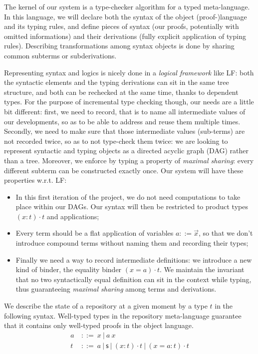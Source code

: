 \documentclass{article}
\newcommand{\sort}{\textsf{s}}
\newcommand{\gor}{\ |\ }
\newcommand{\gdecl}[2]{{#1}\ &::=\ {#2}}
\begin{document}
The kernel of our system is a type-checker algorithm for a typed
meta-language. In this language, we will declare both the syntax of
the object (proof-)language and its typing rules, and define pieces of
syntax (our proofs, potentially with omitted informations) and their
derivations (fully explicit application of typing rules). Describing
transformations among syntax objects is done by sharing common
subterms or subderivations.

Representing syntax and logics is nicely done in a \emph{logical
  framework} like LF: both the syntactic elements and the typing
derivations can sit in the same tree structure, and both can be
rechecked at the same time, thanks to dependent types. For the purpose
of incremental type checking though, our needs are a little bit
different: first, we need to record, that is to name all intermediate
values of our developments, so as to be able to address and reuse them
multiple times. Secondly, we need to make sure that those intermediate
values (sub-terms) are not recorded twice, so as to not type-check
them twice: we are looking to represent syntactic and typing objects
as a directed acyclic graph (DAG) rather than a tree. Moreover, we
enforce by typing a property of \emph{maximal sharing}: every
different subterm can be constructed exactly once. Our system will
have these properties w.r.t. LF:
\begin{itemize}
\item In this first iteration of the project, we do not need
  computations to take place within our DAGs. Our syntax will then be
  restricted to product types $(x:t)\cdot t$ and applications;
\item Every term should be a flat application of variables $a ::= \vec x$, so
  that we don't introduce compound terms without naming them and
  recording their types;
\item Finally we need a way to record intermediate definitions: we
  introduce a new kind of binder, the equality binder $(x=a)\cdot
  t$. We maintain the invariant that no two syntactically equal
  definition can sit in the context while typing, thus guaranteeing
  \emph{maximal sharing} among terms and derivations.
\end{itemize}

We describe the state of a repository at a given moment by a type $t$
in the following syntax. Well-typed types in the repository
meta-language guarantee that it contains only well-typed proofs in the
object language.
\begin{align*}
 \gdecl{a}{x \gor a\ x } \\
 \gdecl{t}{a \gor \sort \gor (x:t)\cdot t \gor (x=a:t)\cdot t}
\end{align*}
\end{document}
